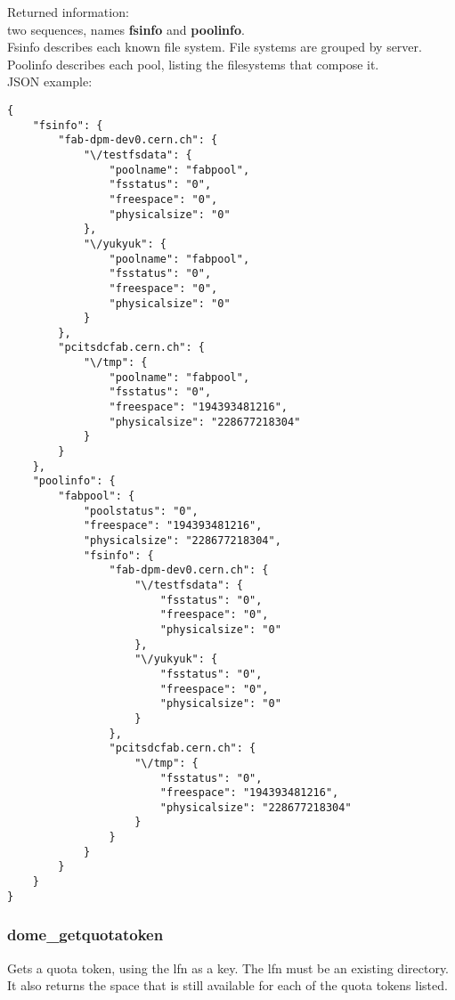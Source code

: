 \documentclass[a4paper,10pt]{scrreprt}
\begin{document}
Returned information:\\
two sequences, names \textbf{fsinfo} and \textbf{poolinfo}.\\
Fsinfo describes each known file system. File systems are grouped by server.\\
Poolinfo describes each pool, listing the filesystems that compose it.\\

JSON example:\\
\begin{lstlisting}
{
    "fsinfo": {
        "fab-dpm-dev0.cern.ch": {
            "\/testfsdata": {
                "poolname": "fabpool",
                "fsstatus": "0",
                "freespace": "0",
                "physicalsize": "0"
            },
            "\/yukyuk": {
                "poolname": "fabpool",
                "fsstatus": "0",
                "freespace": "0",
                "physicalsize": "0"
            }
        },
        "pcitsdcfab.cern.ch": {
            "\/tmp": {
                "poolname": "fabpool",
                "fsstatus": "0",
                "freespace": "194393481216",
                "physicalsize": "228677218304"
            }
        }
    },
    "poolinfo": {
        "fabpool": {
            "poolstatus": "0",
            "freespace": "194393481216",
            "physicalsize": "228677218304",
            "fsinfo": {
                "fab-dpm-dev0.cern.ch": {
                    "\/testfsdata": {
                        "fsstatus": "0",
                        "freespace": "0",
                        "physicalsize": "0"
                    },
                    "\/yukyuk": {
                        "fsstatus": "0",
                        "freespace": "0",
                        "physicalsize": "0"
                    }
                },
                "pcitsdcfab.cern.ch": {
                    "\/tmp": {
                        "fsstatus": "0",
                        "freespace": "194393481216",
                        "physicalsize": "228677218304"
                    }
                }
            }
        }
    }
}
\end{lstlisting}

\subsubsection{dome\_getquotatoken}
Gets a quota token, using the lfn as a key. The lfn must be an existing directory.
It also returns the space that is still available for each of the quota tokens listed.
\end{document}
